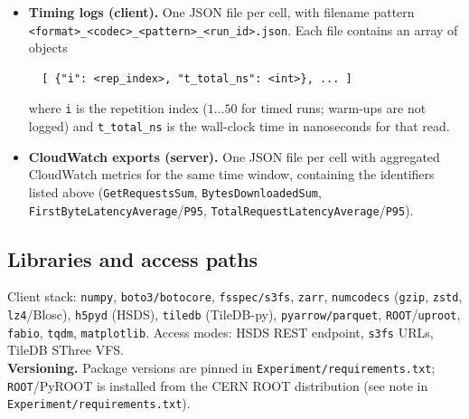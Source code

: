 \documentclass[nomenclature, english, bibtex]{kththesis}
\numberwithin{listing}{chapter}
\begin{document}
\begin{itemize}
  \item \textbf{Timing logs (client).} One \gls{JSON} file per cell, with filename pattern \texttt{<format>\_<codec>\_<pattern>\_<run\_id>.json}. Each file contains an array of objects
  \begin{verbatim}
  [ {"i": <rep_index>, "t_total_ns": <int>}, ... ]
  \end{verbatim}
  where \texttt{i} is the repetition index ($1\ldots50$ for timed runs; warm-ups are not logged) and \texttt{t\_total\_ns} is the wall-clock time in nanoseconds for that read.
  \item \textbf{CloudWatch exports (server).} One \gls{JSON} file per cell with aggregated CloudWatch metrics for the same time window, containing the identifiers listed above (\texttt{GetRequestsSum}, \texttt{BytesDownloadedSum}, \texttt{FirstByteLatencyAverage}/\texttt{P95}, \texttt{TotalRequestLatencyAverage}/\texttt{P95}).
\end{itemize}

\subsection{Libraries and access paths}
\label{app:a5-libraries}
Client stack: \texttt{numpy}, \texttt{boto3/botocore}, \texttt{fsspec/s3fs}, \texttt{zarr}, \texttt{numcodecs} (\texttt{gzip}, \texttt{zstd}, \texttt{lz4}/Blosc), \texttt{h5pyd} (\gls{HSDS}), \texttt{tiledb} (TileDB-py), \texttt{pyarrow/parquet}, \texttt{ROOT}/\texttt{uproot}, \texttt{fabio}, \texttt{tqdm}, \texttt{matplotlib}. Access modes: \gls{HSDS} REST endpoint, \texttt{s3fs} URLs, TileDB \gls{SThree} VFS.\\
\textbf{Versioning.} Package versions are pinned in \texttt{Experiment/requirements.txt}; \texttt{ROOT}/PyROOT is installed from the CERN \gls{ROOT} distribution (see note in \texttt{Experiment/requirements.txt}).
\end{document}
